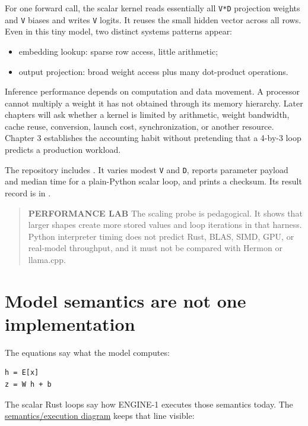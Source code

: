 For one forward call, the scalar kernel reads essentially all
\texttt{V*D} projection weights and \texttt{V} biases and writes
\texttt{V} logits. It reuses the small hidden vector across all rows.
Even in this tiny model, two distinct systems patterns appear:

\begin{itemize}
\tightlist
\item
  embedding lookup: sparse row access, little arithmetic;
\item
  output projection: broad weight access plus many dot-product
  operations.
\end{itemize}

Inference performance depends on computation and data movement. A
processor cannot multiply a weight it has not obtained through its
memory hierarchy. Later chapters will ask whether a kernel is limited by
arithmetic, weight bandwidth, cache reuse, conversion, launch cost,
synchronization, or another resource. Chapter 3 establishes the
accounting habit without pretending that a 4-by-3 loop predicts a
production workload.

The repository includes
\texttt{}.
It varies modest \texttt{V} and \texttt{D}, reports parameter payload
and median time for a plain-Python scalar loop, and prints a checksum.
Its result record is in
\texttt{}.

\begin{quote}
\textbf{PERFORMANCE LAB} The scaling probe is pedagogical. It shows that
larger shapes create more stored values and loop iterations in that
harness. Python interpreter timing does not predict Rust, BLAS, SIMD,
GPU, or real-model throughput, and it must not be compared with Hermon
or llama.cpp.
\end{quote}

\section{Model semantics are not one
implementation}\label{model-semantics-are-not-one-implementation}

The equations say what the model computes:

\begin{verbatim}
h = E[x]
z = W h + b
\end{verbatim}

The scalar Rust loops say how ENGINE-1 executes those semantics today.
The
\href{https://github.com/hermonai/inside-the-llm-engine/blob/astra-visual-rewrite/diagrams/model/semantics-vs-execution.txt}{semantics/execution
diagram} keeps that line visible:

